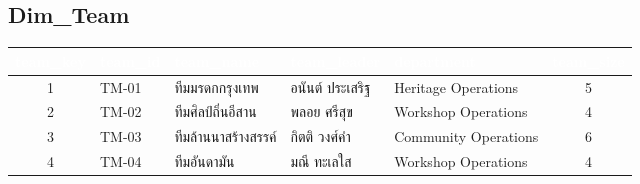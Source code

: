 \documentclass[11pt]{article}
\begin{document}
\subsection*{Dim_Team}
\begin{adjustbox}{max width=\linewidth}
\begin{tabular}{@{}c l l l l c@{}}
\toprule
\rowcolor{tblHead}\textcolor{white}{team_key} & \textcolor{white}{team_id} & \textcolor{white}{team_name} & \textcolor{white}{team_leader} & \textcolor{white}{department} & \textcolor{white}{team_size}\\
\midrule
1 & TM-01 & ทีมมรดกกรุงเทพ & อนันต์ ประเสริฐ & Heritage Operations & 5\\
2 & TM-02 & ทีมศิลป์ถิ่นอีสาน & พลอย ศรีสุข & Workshop Operations & 4\\
3 & TM-03 & ทีมล้านนาสร้างสรรค์ & กิตติ วงศ์คำ & Community Operations & 6\\
4 & TM-04 & ทีมอันดามัน & มณี ทะเลใส & Workshop Operations & 4\\
\bottomrule
\end{tabular}
\end{adjustbox}
\end{document}

